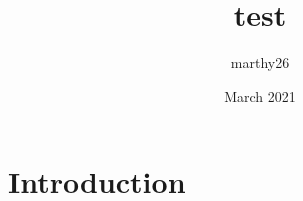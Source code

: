 \documentclass{article}
\title{test}
\author{marthy26 }
\date{March 2021}
\begin{document}
\maketitle

\section{Introduction}
\end{document}
